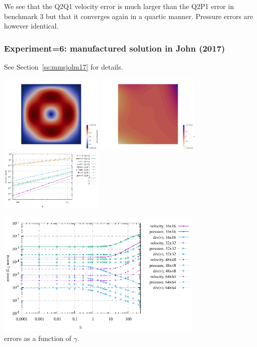 We see that the Q2Q1 velocity error is much larger than the Q2P1 error in benchmark 3 
but that it converges again in a quartic manner.
Pressure errors are however identical.

\subsubsection*{Experiment=6: manufactured solution in John \etal (2017) \cite{jolm17}}

See Section~\ref{ss:mmsjolm17} for details.

\begin{center}
\includegraphics[width=5cm]{python_codes/fieldstone_104/results/exp6/vel}
\includegraphics[width=5cm]{python_codes/fieldstone_104/results/exp6/press}
\includegraphics[width=5cm]{python_codes/fieldstone_104/results/exp6/errors.pdf}
\end{center}


\begin{center}
\includegraphics[height=6cm]{python_codes/fieldstone_104/results/exp6/gamma/errors.pdf}\\
{\captionfont errors as a function of $\gamma$.}
\end{center}



